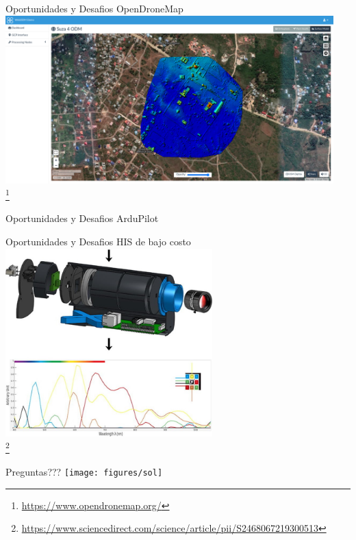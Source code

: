\documentclass{beamer}
\newcommand\blfootnote[1]{%
  \begingroup
  \renewcommand\thefootnote{}\footnote{#1}%
  \addtocounter{footnote}{-1}%
  \endgroup
}
\begin{document}
\begin{frame}{Oportunidades y Desafios}
    OpenDroneMap \\
    \centering
    \includegraphics[width=0.95\textwidth]{figures/odm1}\\
    \blfootnote{\url{https://www.opendronemap.org/}}
\end{frame}
\begin{frame}{Oportunidades y Desafios}
    ArduPilot \\
    \centering
\end{frame}
\begin{frame}{Oportunidades y Desafios}
    HIS de bajo costo \\
    \centering
    \includegraphics[width=0.6\textwidth]{figures/spectometer}\\
    \blfootnote{\url{https://www.sciencedirect.com/science/article/pii/S2468067219300513}}
\end{frame}

\begin{frame}{Preguntas???}
    \centering
    \texttt{[image: figures/sol]}
\end{frame}
\end{document}
